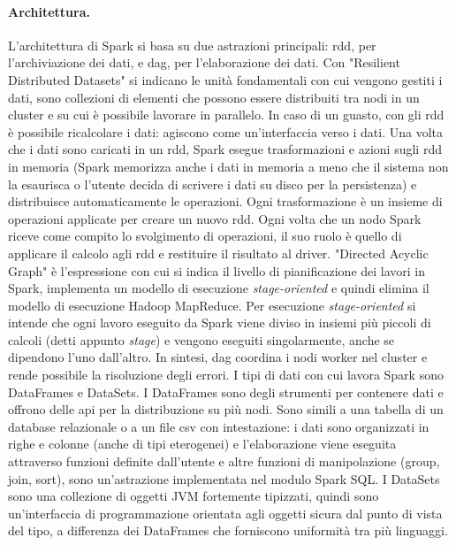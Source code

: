 \documentclass[12pt,a4paper,fleqn,titlepage]{report}
\begin{document}
        \paragraph{Architettura.}
        L'architettura di Spark si basa su due astrazioni principali: \gls{rdd}, per l'archiviazione dei dati, e \gls{dag}, per l'elaborazione dei dati.
        Con "Resilient Distributed Datasets" si indicano le unità fondamentali con cui vengono gestiti i dati, sono collezioni di elementi che possono essere distribuiti tra nodi in un cluster e su cui è possibile lavorare in parallelo. In caso di un guasto, con gli \gls{rdd} è possibile ricalcolare i dati: agiscono come un'interfaccia verso i dati. Una volta che i dati sono caricati in un \gls{rdd}, Spark esegue trasformazioni e azioni sugli \gls{rdd} in memoria (Spark memorizza anche i dati in memoria a meno che il sistema non la esaurisca o l'utente decida di scrivere i dati su disco per la persistenza) e distribuisce automaticamente le operazioni. Ogni trasformazione è un insieme di operazioni applicate per creare un nuovo \gls{rdd}. Ogni volta che un nodo Spark riceve come compito lo svolgimento di operazioni, il suo ruolo è quello di applicare il calcolo agli \gls{rdd} e restituire il risultato al driver.
        "Directed Acyclic Graph" è l'espressione con cui si indica il livello di pianificazione dei lavori in Spark, implementa un modello di esecuzione \emph{stage-oriented} e quindi elimina il modello di esecuzione Hadoop MapReduce. Per esecuzione \emph{stage-oriented} si intende che ogni lavoro eseguito da Spark viene diviso in insiemi più piccoli di calcoli (detti appunto \emph{stage}) e vengono eseguiti singolarmente, anche se dipendono l'uno dall'altro. In sintesi, \gls{dag} coordina i nodi worker nel cluster e rende possibile la risoluzione degli errori.
        I tipi di dati con cui lavora Spark sono DataFrames e DataSets.
        I DataFrames sono degli strumenti per contenere dati e offrono delle \gls{api} per la distribuzione su più nodi. Sono simili a una tabella di un database relazionale o a un file csv con intestazione: i dati sono organizzati in righe e colonne (anche di tipi eterogenei) e l'elaborazione viene eseguita attraverso funzioni definite dall'utente e altre funzioni di manipolazione (group, join, sort), sono un'astrazione implementata nel modulo Spark SQL.
        I DataSets sono una collezione di oggetti JVM fortemente tipizzati, quindi sono un'interfaccia di programmazione orientata agli oggetti sicura dal punto di vista del tipo, a differenza dei DataFrames che forniscono uniformità tra più linguaggi.
\end{document}
